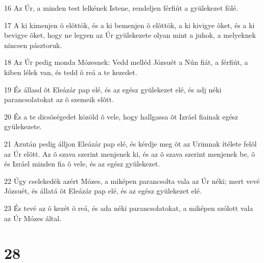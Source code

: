 \par 16 Az Úr, a minden test lelkének Istene, rendeljen férfiút a gyülekezet fölé.
\par 17 A ki kimenjen õ elõttök, és a ki bemenjen õ elõttök, a ki kivigye õket, és a ki bevigye õket, hogy ne legyen az Úr gyülekezete olyan mint a juhok, a melyeknek nincsen pásztoruk.
\par 18 Az Úr pedig monda Mózesnek: Vedd melléd Józsuét a Nún fiát, a férfiút, a kiben lélek van, és tedd õ reá a te kezedet.
\par 19 És állasd õt Eleázár pap elé, és az egész gyülekezet elé, és adj néki parancsolatokat az õ szemeik elõtt.
\par 20 És a te dicsõségedet közöld õ vele, hogy hallgassa õt Izráel fiainak egész gyülekezete.
\par 21 Azután pedig álljon Eleázár pap elé, és kérdje meg õt az Urimnak ítélete felõl az Úr elõtt. Az õ szava szerint menjenek ki, és az õ szava szerint menjenek be, õ és Izráel minden fia õ vele, és az egész gyülekezet.
\par 22 Úgy cselekedék azért Mózes, a miképen parancsolta vala az Úr néki; mert vevé Józsuét, és állatá õt Eleázár pap elé, és az egész gyülekezet elé.
\par 23 És tevé az õ kezét õ reá, és ada néki parancsolatokat, a miképen szólott vala az Úr Mózes által.

\chapter{28}

